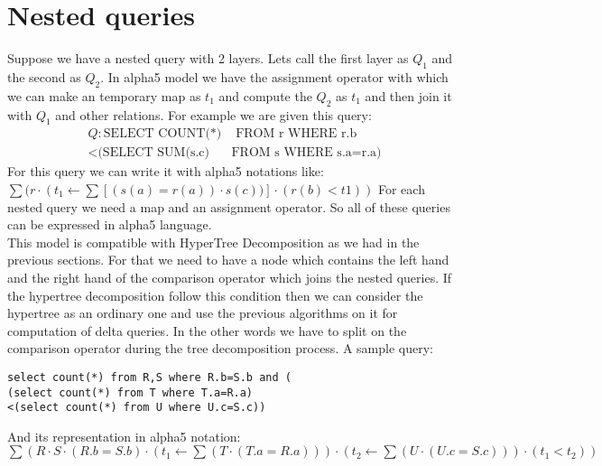 \documentclass[12pt]{article}
\begin{document}
\section{Nested queries}
Suppose we have a nested query with 2 layers. Lets call the first layer as $Q_{1}$ and the second as $Q_{2}$. In alpha5 model we have the assignment operator with which we can make an temporary map as $t_{1}$ and compute the $Q_{2}$ as $t_{1}$ and then join it with $Q_{1}$ and other relations. For example we are given this query:
\begin{align*}
Q: \text{SELECT COUNT(*)} &\text{  FROM r WHERE r.b}\\
<\text{(SELECT SUM(s.c) } & \text{FROM s WHERE s.a=r.a)}
\end{align*}
For this query we can write it with alpha5 notations like: $\sum(r\cdot(t_{1}\gets \sum[(s(a)=r(a))\cdot s(c))]\cdot(r(b)<t1))$ 
For each nested query we need a map and an assignment operator. So all of these queries can be expressed in alpha5 language. 
\\

This model is compatible with HyperTree Decomposition as we had in the previous sections. For that we need to have a node which contains the left hand and the right hand of the comparison operator which joins the nested queries. If the hypertree decomposition follow this condition then we can consider the hypertree as an ordinary one and use the previous algorithms on it for computation of delta queries. In the other words we have to split on the comparison operator during the tree decomposition process.
A sample query:
\lstset{language=SQL}
\begin{lstlisting}
select count(*) from R,S where R.b=S.b and (
(select count(*) from T where T.a=R.a)
<(select count(*) from U where U.c=S.c))
\end{lstlisting}

And its representation in alpha5 notation: 
$\sum(R\cdot S\cdot(R.b=S.b)\cdot(t_{1}\gets\sum(T\cdot(T.a=R.a)))\cdot(t_{2}\gets\sum(U\cdot(U.c=S.c)))\cdot(t_{1}<t_{2}))$\\
\end{document}
